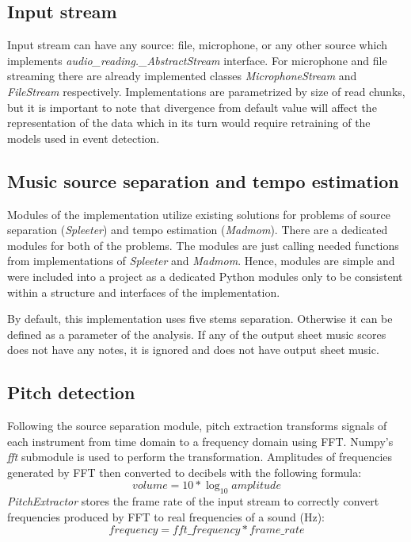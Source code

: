 \subsection{Input stream}\label{subsec:input-stream}
Input stream can have any source: file, microphone, or any other source which implements
\textit{audio\_reading.\_AbstractStream} interface. For microphone and file streaming there are already implemented
classes \textit{MicrophoneStream} and \textit{FileStream} respectively. Implementations are parametrized by size of read
chunks, but it is important to note that divergence from default value will affect the representation of the data which
in its turn would require retraining of the models used in event detection.


\subsection{Music source separation and tempo estimation}\label{subsec:music-source-separation-and-tempo-estimation}
Modules of the implementation utilize existing solutions for problems of source separation (\textit{Spleeter}) and tempo
estimation (\textit{Madmom}). There are a dedicated modules for both of the problems. The modules are just calling
needed functions from implementations of \textit{Spleeter} and \textit{Madmom}. Hence, modules are simple and were
included into a project as a dedicated Python modules only to be consistent within a structure and interfaces of
the implementation.

By default, this implementation uses five stems separation. Otherwise it can be defined as a parameter of the analysis.
If any of the output sheet music scores does not have any notes, it is ignored and does not have output sheet music.

\subsection{Pitch detection}\label{subsec:pitch-detection}
Following the source separation module, pitch extraction transforms signals of each instrument from time domain to
a frequency domain using \ac{FFT}. Numpy's \textit{fft} submodule is used to perform the transformation. Amplitudes
of frequencies generated by \ac{FFT} then converted to decibels with the following formula:
\[volume = 10 * \log_{10}amplitude\]
\textit{PitchExtractor} stores the frame rate of the input stream to correctly convert frequencies produced by \ac{FFT}
to real frequencies of a sound (Hz):
\[frequency = fft\_frequency * frame\_rate\]

